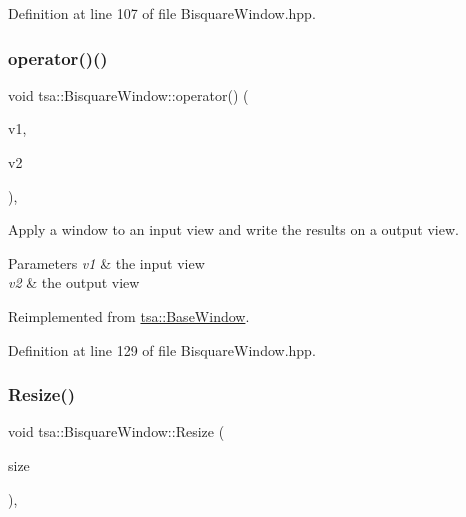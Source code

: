 Definition at line 107 of file Bisquare\+Window.\+hpp.

\mbox{\label{classtsa_1_1_bisquare_window_a18002b225ed630af739a983da72a4006}} 
\subsubsection{\texorpdfstring{operator()()}{operator()()}\hspace{0.1cm}{\footnotesize\ttfamily [2/2]}}
{\footnotesize\ttfamily void tsa\+::\+Bisquare\+Window\+::operator() (\begin{DoxyParamCaption}\item[{\hyperlink{namespacetsa_ac599574bcc094eda25613724b8f3ca9e}{Seq\+View\+Double} \&}]{v1,  }\item[{\hyperlink{namespacetsa_ac599574bcc094eda25613724b8f3ca9e}{Seq\+View\+Double} \&}]{v2 }\end{DoxyParamCaption})\hspace{0.3cm}{\ttfamily [inline]}, {\ttfamily [virtual]}}

Apply a window to an input view and write the results on a output view.


\begin{DoxyParams}{Parameters}
{\em v1} & the input view \\
\hline
{\em v2} & the output view \\
\hline
\end{DoxyParams}


Reimplemented from \hyperlink{classtsa_1_1_base_window_afda50daa943527e09792b06e5ba69bcb}{tsa\+::\+Base\+Window}.



Definition at line 129 of file Bisquare\+Window.\+hpp.

\mbox{\label{classtsa_1_1_bisquare_window_a0970518373e007e0fdd95701ff744c6f}} 
\subsubsection{\texorpdfstring{Resize()}{Resize()}}
{\footnotesize\ttfamily void tsa\+::\+Bisquare\+Window\+::\+Resize (\begin{DoxyParamCaption}\item[{unsigned int}]{size }\end{DoxyParamCaption})\hspace{0.3cm}{\ttfamily [inline]}, {\ttfamily [virtual]}}

